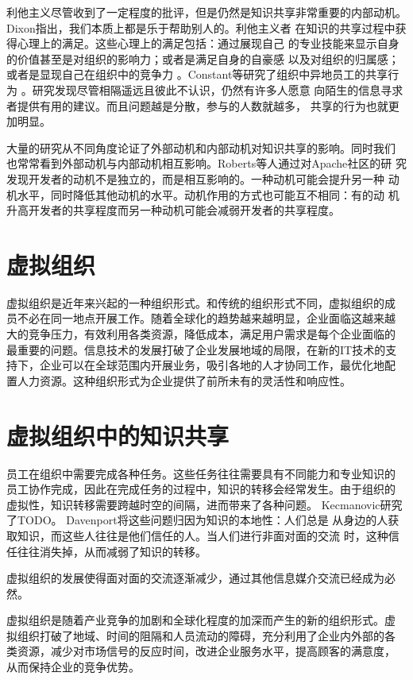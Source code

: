 \documentclass[12pt,a4paper]{ctexart}
\begin{document}
利他主义尽管收到了一定程度的批评，但是仍然是知识共享非常重要的内部动机。
Dixon指出，我们本质上都是乐于帮助别人的\cite{dixon2000ckc}。利他主义者
在知识的共享过程中获得心理上的满足。这些心理上的满足包括：通过展现自己
的专业技能来显示自身的价值甚至是对组织的影响力；或者是满足自身的自豪感
以及对组织的归属感；或者是显现自己在组织中的竞争力
\cite{443078119941201}。Constant等研究了组织中异地员工的共享行为
\cite{44348771996}。研究发现尽管相隔遥远且彼此不认识，仍然有许多人愿意
向陌生的信息寻求者提供有用的建议。而且问题越是分散，参与的人数就越多，
共享的行为也就更加明显。

大量的研究从不同角度论证了外部动机和内部动机对知识共享的影响。同时我们
也常常看到外部动机与内部动机相互影响。Roberts等人通过对Apache社区的研
究发现开发者的动机不是独立的，而是相互影响的。一种动机可能会提升另一种
动机水平，同时降低其他动机的水平。动机作用的方式也可能互不相同：有的动
机升高开发者的共享程度而另一种动机可能会减弱开发者的共享程度\cite{2151758320060701}。


\section{虚拟组织}

虚拟组织是近年来兴起的一种组织形式。和传统的组织形式不同，虚拟组织的成
员不必在同一地点开展工作。随着全球化的趋势越来越明显，企业面临这越来越
大的竞争压力，有效利用各类资源，降低成本，满足用户需求是每个企业面临的
最重要的问题。信息技术的发展打破了企业发展地域的局限，在新的IT技术的支
持下，企业可以在全球范围内开展业务，吸引各地的人才协同工作，最优化地配
置人力资源。这种组织形式为企业提供了前所未有的灵活性和响应性。

\section{虚拟组织中的知识共享}
员工在组织中需要完成各种任务。这些任务往往需要具有不同能力和专业知识的
员工协作完成，因此在完成任务的过程中，知识的转移会经常发生。由于组织的
虚拟性，知识转移需要跨越时空的间隔，进而带来了各种问题。
Kecmanovic\cite{cecezkecmanovic2001eap}研究了TODO。
Davenport\cite{davenport1998wko}将这些问题归因为知识的本地性：人们总是
从身边的人获取知识，而这些人往往是他们信任的人。当人们进行非面对面的交流
时，这种信任往往消失掉，从而减弱了知识的转移。

虚拟组织的发展使得面对面的交流逐渐减少，通过其他信息媒介交流已经成为必
然。

虚拟组织是随着产业竞争的加剧和全球化程度的加深而产生的新的组织形式。虚
拟组织打破了地域、时间的阻隔和人员流动的障碍，充分利用了企业内外部的各
类资源，减少对市场信号的反应时间，改进企业服务水平，提高顾客的满意度，
从而保持企业的竞争优势。
\end{document}
